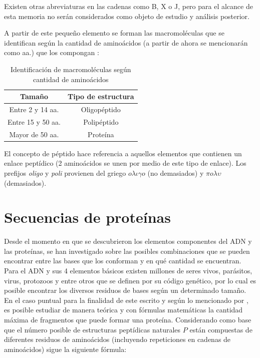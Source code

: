 Existen otras abreviaturas en las cadenas como B, X o J, pero para el alcance de esta memoria no serán considerados como objeto de estudio y análisis posterior.

A partir de este pequeño elemento se forman las macromoléculas que se identifican según la cantidad de aminoácidos (a partir de ahora se mencionarán como aa.) que los compongan \cite{array}:

\begin{table}[H]
\centering
\label{my-label1}
\begin{tabular}{|c|c|}
\hline
Tamaño & \multicolumn{1}{c|}{Tipo de estructura}  \\ \hline
Entre 2 y 14 aa.      &      Oligopéptido                             \\
Entre 15 y 50 aa.      &   Polipéptido      \\
Mayor de 50 aa.   &   Proteína            \\ \hline
\end{tabular}
\caption{Identificación de macromoléculas según cantidad de aminoácidos}
\end{table}

El concepto de péptido \cite{array} hace referencia a aquellos elementos que contienen un enlace peptídico (2 aminoácidos se unen por medio de este tipo de enlace). Los prefijos \textit{oligo} y \textit{poli} provienen del griego $o \lambda \iota \gamma o$ (no demasiados) y $\pi o \lambda \upsilon$ (demasiados).

\section{Secuencias de proteínas}

Desde el momento en que se descubrieron los elementos componentes del ADN y las proteínas, se han investigado sobre las posibles combinaciones que se pueden encontrar entre las bases que los conforman y en qué cantidad se encuentran. Para el ADN y sus 4 elementos básicos existen millones de seres vivos, parásitos, virus, protozoos y entre otros que se definen por su código genético, por lo cual es posible encontrar los diversos residuos de bases según un determinado tamaño. En el caso puntual para la finalidad de este escrito y según lo mencionado por \cite{zamyatnin1}, es posible estudiar de manera teórica y con fórmulas matemáticas la cantidad máxima de fragmentos que puede formar una proteína. Considerando como base que el número posible de estructuras peptídicas naturales $P$ están compuestas de diferentes residuos de aminoácidos (incluyendo repeticiones en cadenas de aminoácidos) sigue la siguiente fórmula:

